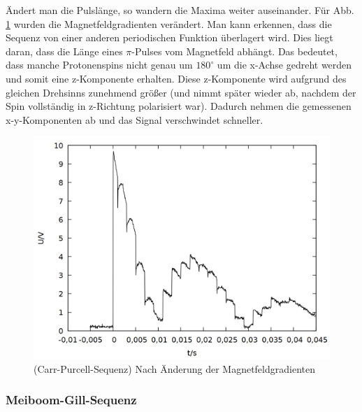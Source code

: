 Ändert man die Pulslänge, so wandern die Maxima weiter auseinander. Für Abb. \ref{fig:carr_b} wurden die Magnetfeldgradienten verändert. Man kann erkennen, dass die Sequenz von einer anderen periodischen Funktion überlagert wird. Dies liegt daran, dass die Länge eines $\pi$-Pulses vom Magnetfeld abhängt. Das bedeutet, dass manche Protonenspins nicht genau um $180^\circ$ um die x-Achse gedreht werden und somit eine z-Komponente erhalten. Diese z-Komponente wird aufgrund des gleichen Drehsinns zunehmend größer (und nimmt später wieder ab, nachdem der Spin vollständig in z-Richtung polarisiert war). Dadurch nehmen die gemessenen x-y-Komponenten ab und das Signal verschwindet schneller.
 
\begin{figure}[h]
\centering
\includegraphics[width=0.75\linewidth]{data/p402_443_data/carr_purcell_sequenz/plot_157.png}
\caption{(Carr-Purcell-Sequenz) Nach Änderung der Magnetfeldgradienten}
\label{fig:carr_b}
\end{figure}
\newpage

\subsubsection{Meiboom-Gill-Sequenz}

